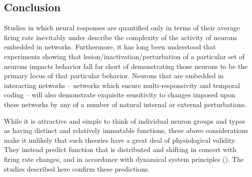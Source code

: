 \begin{refsection}
\section{Conclusion}
Studies in which neural responses are quantified only in terms of their average firing rate inevitably under describe the complexity of the activity of neurons embedded in networks. Furthermore, it has long been understood that experiments showing that lesion/inactivation/perturbation of a particular set of neurons impacts behavior fall far short of demonstrating those neurons to be the primary locus of that particular behavior. Neurons that are embedded in interacting networks – networks which ensure multi-responsivity and temporal coding – will also demonstrate exquisite sensitivity to changes imposed upon these networks by any of a number of natural internal or external perturbations.

While it is attractive and simple to think of individual neuron groups and types as having distinct and relatively immutable functions, these above considerations make it unlikely that such theories have a great deal of physiological validity. They instead predict function that is distributed and shifting in concert with firing rate changes, and in accordance with dynamical system principles (\cite{jones2006a,camera2019a,miller2016a}). The studies described here confirm these predictions.

\printbibliography[title={References}]

\end{refsection}
